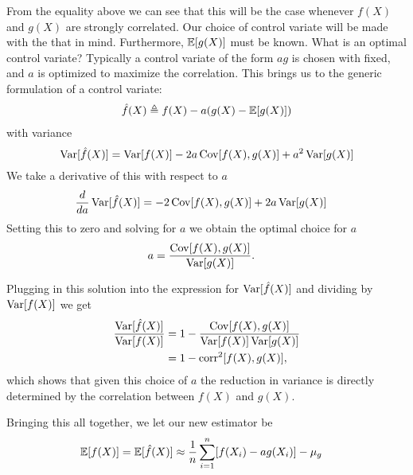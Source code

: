From the equality above we can see that this will be the case whenever $f(X)$ and $g(X)$ are strongly correlated. Our choice of control variate will be made with the that in mind. Furthermore, $\operatorname{\mathbb{E}} [ g(X) ]$ must be known. What is an optimal control variate? Typically a control variate of the form $ag$ is chosen with fixed, and $a$ is optimized to maximize the correlation. This brings us to the generic formulation of a control variate:
\begin{align*}
    \hat{f}(X) \triangleq f(X) - a(g(X) - \operatorname{\mathbb{E}} [ g(X) ])
\end{align*}
with variance
\begin{equation*}
  \operatorname{Var} [ \hat{f}(X) ] = \operatorname{Var} [ f(X) ] - 2a  \operatorname{Cov} [ f(X), g(X) ] + a^2 \operatorname{Var} [ g(X) ] \\
\end{equation*}
We take a derivative of this with respect to $a$
\begin{align*}
    \frac{d}{d a}\operatorname{Var} [ \hat{f}(X) ] &= - 2  \operatorname{Cov} [ f(X), g(X) ] + 2a \operatorname{Var} [ g(X) ]
\end{align*}
Setting this to zero and solving for $a$ we obtain the optimal choice for $a$
\begin{align}
\label{eq:cv-scale}
  a &= \frac{ \operatorname{Cov} [ f(X), g(X) ]}{ \operatorname{Var} [ g(X) ]}.
\end{align}

Plugging in this solution into the expression for $\operatorname{Var} [ \hat{f}(X) ]$ and dividing by $\operatorname{Var} [ f(X) ]$ we get
\begin{align}
\label{eq:var-red}
  \frac{\operatorname{Var} [ \hat{f}(X) ]}{\operatorname{Var} [ f(X) ]}
    &= 1 - \frac{\operatorname{Cov}[ f(X), g(X) ]}{ \operatorname{Var} [ f(X) ]  \operatorname{Var} [ g(X) ]} \\
    &= 1 - \operatorname{corr}^2 [ f(X), g(X) ],
\end{align}
which shows that given this choice of $a$ the reduction in variance is directly determined by the correlation between $f(X)$ and $g(X)$.

Bringing this all together, we let our new estimator be
\begin{align*}
  \operatorname{\mathbb{E}} [ f(X) ]
    &= \operatorname{\mathbb{E}} [ \hat{f}(X) ] \approx \frac{1}{n} \sum_{i=1}^n [ f(X_i) - ag(X_i) ] - \mu_{g}
\end{align*}


